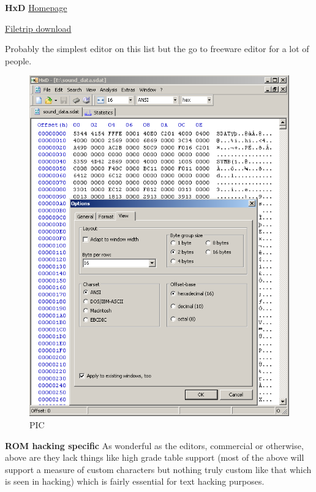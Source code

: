 \documentclass[
]{book}
\begin{document}
\textbf{HxD} \href{http://mh-nexus.de/en/hxd/}{Homepage}

\href{http://filetrip.net/pc-downloads/applications/download-hxd-hex-editor-1770-f12907.html}{Filetrip download}

Probably the simplest editor on this list but the go to freeware editor for a lot of people.

\begin{figure}
\centering
\includegraphics{images/6_home_fast6191_romhackingguide_unrenamed_files___rders_romhackingguidehexeditorsshowcaseHxD1.png}
\caption{PIC}
\end{figure}

\textbf{ROM hacking specific} As wonderful as the editors, commercial or otherwise, above are they lack things like high grade table support (most of the above will support a measure of custom characters but nothing truly custom like that which is seen in hacking) which is fairly essential for text hacking purposes.
\end{document}
